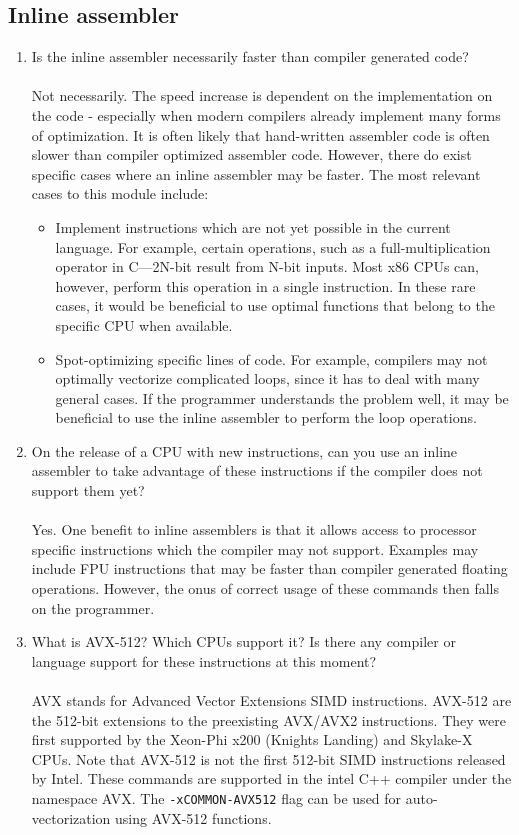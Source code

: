 \documentclass{article}
\begin{document}
\subsection{Inline assembler}
\begin{enumerate}
\item{Is the inline assembler necessarily faster than compiler generated code?}\\\\
Not necessarily. The speed increase is dependent on the implementation on the code - especially when modern compilers already implement many forms of optimization. It is often likely that hand-written assembler code is often slower than compiler optimized assembler code. However, there do exist specific cases where an inline assembler may be faster. The most relevant cases to this module include:
\begin{itemize}
\item{Implement instructions which are not yet possible in the current language. For example, certain operations, such as a full-multiplication operator in C---2N-bit result from N-bit inputs. Most x86 CPUs can, however, perform this operation in a single instruction. In these rare cases, it would be beneficial to use optimal functions that belong to the specific CPU when available.}
\item{Spot-optimizing specific lines of code. For example, compilers may not optimally vectorize complicated loops, since it has to deal with many general cases. If the programmer understands the problem well, it may be beneficial to use the inline assembler to perform the loop operations.}
\end{itemize}
\item{On the release of a CPU with new instructions, can you use an inline assembler to take advantage of these instructions if the compiler does not support them yet?}\\\\
Yes. One benefit to inline assemblers is that it allows access to processor specific instructions which the compiler may not support. Examples may include FPU instructions that may be faster than compiler generated floating operations. However, the onus of correct usage of these commands then falls on the programmer.
\item{What is AVX-512? Which CPUs support it? Is there any compiler or language support for these instructions at this moment?}\\\\
AVX stands for Advanced Vector Extensions SIMD instructions. AVX-512 are the 512-bit extensions to the preexisting AVX/AVX2 instructions. They were first supported by the Xeon-Phi x200 (Knights Landing) and Skylake-X CPUs. Note that AVX-512 is not the first 512-bit SIMD instructions released by Intel. These commands are supported in the intel C++ compiler under the namespace AVX. The \verb!-xCOMMON-AVX512! flag can be used for auto-vectorization using AVX-512 functions.

\end{enumerate}
\end{document}
